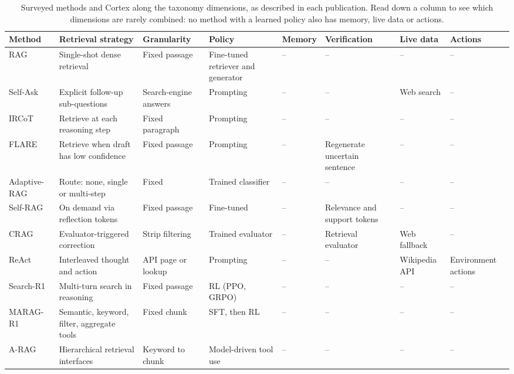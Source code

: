 \documentclass[conference]{IEEEtran}
\begin{document}
\begin{table}[t]
\centering
\caption{Surveyed methods and Cortex along the taxonomy dimensions, as described in each publication. Read down a column to see which dimensions are rarely combined: no method with a learned policy also has memory, live data or actions.}
\label{tab:compare}
\scriptsize
\setlength{\tabcolsep}{3pt}
\renewcommand{\arraystretch}{1.12}
\begin{tabular}{@{}p{1.55cm}p{3.05cm}p{2.05cm}p{2.0cm}p{1.75cm}p{2.25cm}p{1.75cm}p{1.6cm}@{}}
\toprule
\textbf{Method} & \textbf{Retrieval strategy} & \textbf{Granularity} & \textbf{Policy} & \textbf{Memory} & \textbf{Verification} & \textbf{Live data} & \textbf{Actions} \\
\midrule
RAG~\cite{lewis2020rag} & Single-shot dense retrieval & Fixed passage & Fine-tuned retriever and generator & -- & -- & -- & -- \\
Self-Ask~\cite{press2023selfask} & Explicit follow-up sub-questions & Search-engine answers & Prompting & -- & -- & Web search & -- \\
IRCoT~\cite{trivedi2023ircot} & Retrieve at each reasoning step & Fixed paragraph & Prompting & -- & -- & -- & -- \\
FLARE~\cite{jiang2023flare} & Retrieve when draft has low confidence & Fixed passage & Prompting & -- & Regenerate uncertain sentence & -- & -- \\
Adaptive-RAG~\cite{jeong2024adaptiverag} & Route: none, single or multi-step & Fixed & Trained classifier & -- & -- & -- & -- \\
Self-RAG~\cite{asai2024selfrag} & On demand via reflection tokens & Fixed passage & Fine-tuned & -- & Relevance and support tokens & -- & -- \\
CRAG~\cite{yan2024crag} & Evaluator-triggered correction & Strip filtering & Trained evaluator & -- & Retrieval evaluator & Web fallback & -- \\
ReAct~\cite{yao2023react} & Interleaved thought and action & API page or lookup & Prompting & -- & -- & Wikipedia API & Environment actions \\
Search-R1~\cite{jin2025searchr1} & Multi-turn search in reasoning & Fixed passage & RL (PPO, GRPO) & -- & -- & -- & -- \\
MARAG-R1~\cite{luo2025maragr1} & Semantic, keyword, filter, aggregate tools & Fixed chunk & SFT, then RL & -- & -- & -- & -- \\
A-RAG~\cite{du2026arag} & Hierarchical retrieval interfaces & Keyword to chunk & Model-driven tool use & -- & -- & -- & -- \\

\end{tabular}
\end{table}
\end{document}
